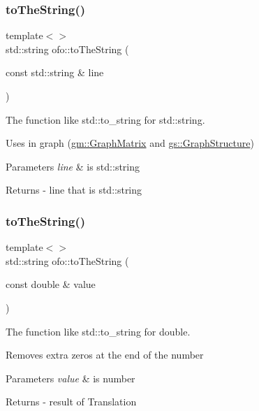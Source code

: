 \subsubsection{\texorpdfstring{to\+The\+String()}{toTheString()}\hspace{0.1cm}{\footnotesize\ttfamily [3/4]}}
{\footnotesize\ttfamily template$<$$>$ \\
std\+::string ofo\+::to\+The\+String (\begin{DoxyParamCaption}\item[{const std\+::string \&}]{line }\end{DoxyParamCaption})}



The function like std\+::to\+\_\+string for std\+::string. 

Uses in graph (\mbox{\hyperlink{classgm_1_1_graph_matrix}{gm\+::\+Graph\+Matrix}} and \mbox{\hyperlink{classgs_1_1_graph_structure}{gs\+::\+Graph\+Structure}}) 
\begin{DoxyParams}{Parameters}
{\em line} & is std\+::string \\
\hline
\end{DoxyParams}
\begin{DoxyReturn}{Returns}
-\/ line that is std\+::string 
\end{DoxyReturn}
\mbox{\label{namespaceofo_a7afe8b17c1060a8756bff591f3a6e163}} 
\subsubsection{\texorpdfstring{to\+The\+String()}{toTheString()}\hspace{0.1cm}{\footnotesize\ttfamily [4/4]}}
{\footnotesize\ttfamily template$<$$>$ \\
std\+::string ofo\+::to\+The\+String (\begin{DoxyParamCaption}\item[{const double \&}]{value }\end{DoxyParamCaption})}



The function like std\+::to\+\_\+string for double. 

Removes extra zeros at the end of the number 
\begin{DoxyParams}{Parameters}
{\em value} & is number \\
\hline
\end{DoxyParams}
\begin{DoxyReturn}{Returns}
-\/ result of Translation 
\end{DoxyReturn}

